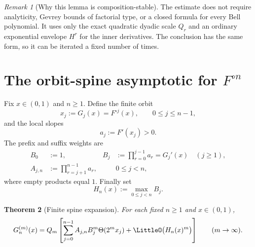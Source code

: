 \documentclass[11pt,oneside]{article}
\newtheorem{theorem}{Theorem}[section]
\theoremstyle{definition}
\theoremstyle{remark}
\newtheorem{remark}[theorem]{Remark}
\newcommand{\comp}{\mathbin{\circ}}
\newcommand{\ThetaF}{\Theta}
\begin{document}
\begin{remark}[Why this lemma is composition-stable]
The estimate does not require analyticity, Gevrey bounds of factorial type, or a
closed formula for every Bell polynomial.  It uses only the exact quadratic dyadic
scale $Q_r$ and an ordinary exponential envelope $H^r$ for the inner derivatives.
The conclusion has the same form, so it can be iterated a fixed number of times.
\end{remark}

\section[The orbit-spine asymptotic for compositional iterates]{The orbit-spine asymptotic for $F^{\comp n}$}
\label{sec:spines}

Fix $x\in(0,1)$ and $n\geq1$.  Define the finite orbit
\begin{equation}
  x_j:=G_j(x)=F^{\comp j}(x),\qquad 0\leq j\leq n-1,
  \label{eq:orbit}
\end{equation}
and the local slopes
\begin{equation}
  a_j:=F'(x_j)>0.
  \label{eq:slopes}
\end{equation}
The prefix and suffix weights are
\begin{align}
 B_0&:=1,
 &B_j&:=\prod_{r=0}^{j-1}a_r=G_j'(x)\quad(j\geq1),
 \label{eq:prefix}\\
 A_{j,n}&:=\prod_{r=j+1}^{n-1}a_r,
 &&0\leq j<n,
 \label{eq:suffix}
\end{align}
where empty products equal $1$.  Finally set
\begin{equation}
 H_n(x):=\max_{0\leq j<n}B_j.
 \label{eq:Hn}
\end{equation}

\begin{theorem}[Finite spine expansion]
\label{thm:spine-expansion}
For each fixed $n\geq1$ and $x\in(0,1)$,
\begin{equation}
 G_n^{(m)}(x)
 =Q_m\left[
   \sum_{j=0}^{n-1}A_{j,n}B_j^m\ThetaF(2^m x_j)
   +\LittleO\bigl(H_n(x)^m\bigr)
 \right]
 \qquad(m\to\infty).
 \label{eq:spine-expansion}
\end{equation}
\end{theorem}
\end{document}
